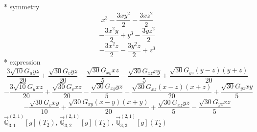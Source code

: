 \documentclass[fleqn,8pt]{jsarticle}
\begin{document}
\noindent\quad ** symmetry
\begin{dmath*}
x^{3} - \frac{3 x y^{2}}{2} - \frac{3 x z^{2}}{2}
\end{dmath*}
\begin{dmath*}
- \frac{3 x^{2} y}{2} + y^{3} - \frac{3 y z^{2}}{2}
\end{dmath*}
\begin{dmath*}
- \frac{3 x^{2} z}{2} - \frac{3 y^{2} z}{2} + z^{3}
\end{dmath*}
\noindent\quad ** expression
\begin{dmath*}
\frac{3 \sqrt{10} G_{u} y z}{20} + \frac{\sqrt{30} G_{v} y z}{20} + \frac{\sqrt{30} G_{xy} x z}{5} - \frac{\sqrt{30} G_{xz} x y}{5} + \frac{\sqrt{30} G_{yz} \left(y - z\right) \left(y + z\right)}{20}
\end{dmath*}
\begin{dmath*}
- \frac{3 \sqrt{10} G_{u} x z}{20} + \frac{\sqrt{30} G_{v} x z}{20} - \frac{\sqrt{30} G_{xy} y z}{5} - \frac{\sqrt{30} G_{xz} \left(x - z\right) \left(x + z\right)}{20} + \frac{\sqrt{30} G_{yz} x y}{5}
\end{dmath*}
\begin{dmath*}
- \frac{\sqrt{30} G_{v} x y}{10} + \frac{\sqrt{30} G_{xy} \left(x - y\right) \left(x + y\right)}{20} + \frac{\sqrt{30} G_{xz} y z}{5} - \frac{\sqrt{30} G_{yz} x z}{5}
\end{dmath*}
\noindent\quad $\vec{\mathbb{Q}}_{3,1}^{(2,1)}[g](T_{2})$, $\vec{\mathbb{Q}}_{3,2}^{(2,1)}[g](T_{2})$, $\vec{\mathbb{Q}}_{3,3}^{(2,1)}[g](T_{2})$
\end{document}
